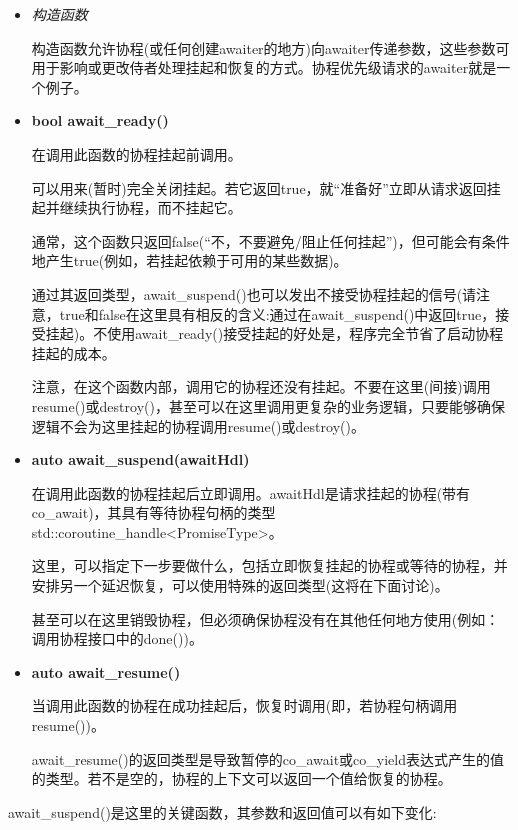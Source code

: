 \begin{itemize}
\item 
\textit{构造函数}

构造函数允许协程(或任何创建awaiter的地方)向awaiter传递参数，这些参数可用于影响或更改侍者处理挂起和恢复的方式。协程优先级请求的awaiter就是一个例子。

\item 
\textbf{bool await\_ready()}

在调用此函数的协程挂起前调用。

可以用来(暂时)完全关闭挂起。若它返回true，就“准备好”立即从请求返回挂起并继续执行协程，而不挂起它。

通常，这个函数只返回false(“不，不要避免/阻止任何挂起”)，但可能会有条件地产生true(例如，若挂起依赖于可用的某些数据)。

通过其返回类型，await\_suspend()也可以发出不接受协程挂起的信号(请注意，true和false在这里具有相反的含义:通过在await\_suspend()中返回true，接受挂起)。不使用await\_ready()接受挂起的好处是，程序完全节省了启动协程挂起的成本。

注意，在这个函数内部，调用它的协程还没有挂起。不要在这里(间接)调用resume()或destroy()，甚至可以在这里调用更复杂的业务逻辑，只要能够确保逻辑不会为这里挂起的协程调用resume()或destroy()。

\item
\textbf{auto await\_suspend(awaitHdl)}

在调用此函数的协程挂起后立即调用。awaitHdl是请求挂起的协程(带有co\_await)，其具有等待协程句柄的类型std::coroutine\_handle<PromiseType>。

这里，可以指定下一步要做什么，包括立即恢复挂起的协程或等待的协程，并安排另一个延迟恢复，可以使用特殊的返回类型(这将在下面讨论)。

甚至可以在这里销毁协程，但必须确保协程没有在其他任何地方使用(例如：调用协程接口中的done())。

\item 
\textbf{auto await\_resume()}

当调用此函数的协程在成功挂起后，恢复时调用(即，若协程句柄调用resume())。

await\_resume()的返回类型是导致暂停的co\_await或co\_yield表达式产生的值的类型。若不是空的，协程的上下文可以返回一个值给恢复的协程。
\end{itemize}

await\_suspend()是这里的关键函数，其参数和返回值可以有如下变化:

